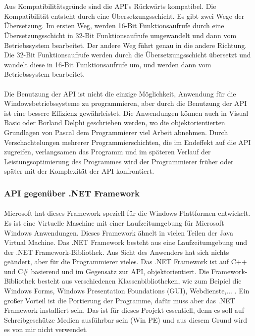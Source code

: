 \\\\
Aus Kompatibilitätsgründe sind die API's Rückwärts kompatibel. Die Kompatibilität entsteht durch eine Übersetzungsschicht. Es gibt zwei Wege der Übersetzung. Im ersten Weg, werden 16-Bit Funktionsaufrufe durch eine Übersetzungsschicht in 32-Bit Funktionsaufrufe umgewandelt und dann vom Betriebssystem bearbeitet. Der andere Weg führt genau in die andere Richtung. Die 32-Bit Funktionsaufrufe werden durch die Übersetzungsschicht übersetzt und wandelt diese in 16-Bit Funktionsaufrufe um, und werden dann vom Betriebssystem bearbeitet.
\\\\
Die Benutzung der API ist nicht die einzige Möglichkeit, Anwendung für die Windowsbetriebssysteme zu programmieren, aber durch die Benutzung der API ist eine bessere Effizienz gewährleistet. Die Anwendungen können auch in Visual Basic oder Borland Delphi geschrieben werden, wo die objektorientierten Grundlagen von Pascal dem Programmierer viel Arbeit abnehmen. Durch Verschachtelungen mehrerer Programmierschichten, die im Endeffekt auf die  API zugreifen, verlangsamen das Programm und im späteren Verlauf der Leistungsoptimierung des Programmes wird der Programmierer früher oder später mit der Komplexität der API konfrontiert.

\subsubsection{API gegenüber .NET Framework}
\paragraph{}
Microsoft hat dieses Framework speziell für die Windows-Plattformen entwickelt. Es ist eine Virtuelle Maschine mit einer Laufzeitumgebung für Microsoft Windows Anwendungen. Dieses Framework ähnelt in vielen Teilen der Java Virtual Machine. Das .NET Framework besteht aus eine Laufzeitumgebung und der .NET Framework-Bibliothek. Aus Sicht des Anwenders hat sich nichts geändert, aber für die Programmierer vieles. Das .NET Framework ist auf C++ und C\# basierend und im Gegensatz zur API, objektorientiert. Die Framework-Bibliothek besteht aus verschiedenen Klassenbibliotheken, wie zum Beipiel die Windows Forms, Windows Presentation Foundations (GUI), Webdienste,... . Ein großer Vorteil ist die Portierung der Programme, dafür muss aber das .NET Framework installiert sein. Das ist für dieses Projekt essentiell, denn es soll auf Schreibgeschütze Medien ausführbar sein (Win PE) und aus diesem Grund wird es von mir nicht verwendet.




